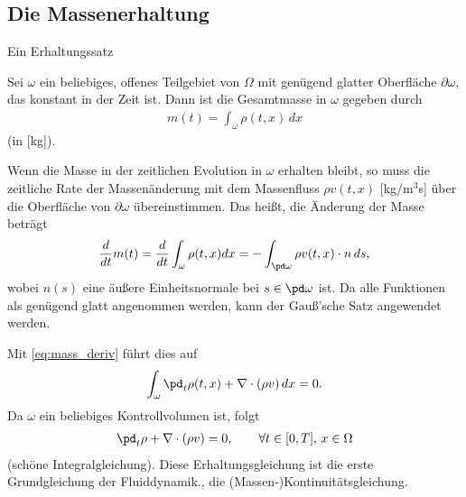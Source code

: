 \subsection{Die Massenerhaltung}
\begin{bemerkung} Ein Erhaltungssatz

Sei $\omega$ ein beliebiges, offenes Teilgebiet von $\Omega$ mit genügend glatter Oberfläche $\partial \omega$, das konstant in der Zeit ist. Dann ist die Gesamtmasse in $\omega$ gegeben durch
\begin{align*}
  m(t) = \int_{\omega}\rho(t, x) \,dx
\end{align*}
(in [kg]).

Wenn die Masse in der zeitlichen Evolution in $\omega$ erhalten bleibt, so muss die zeitliche Rate der Massenänderung mit dem Massenfluss $\rho v(t, x)$ [kg/m$^{3}$s] über die Oberfläche von $\partial \omega$ übereinstimmen. Das heißt, die Änderung der Masse beträgt
\begin{align}\label{eq:mass_deriv}
  \frac{d}{dt} m(t) = \frac d {dt} \int_{\omega} \rho(t, x) dx = - \int_{\pd \omega} \rho v(t, x) \cdot n \,ds,
\end{align}
wobei $n(s)$ eine äußere Einheitsnormale bei $s \in \pd \omega$ ist. Da alle Funktionen als genügend glatt angenommen werden, kann der Gauß'sche Satz angewendet werden. 

Mit \eqref{eq:mass_deriv} führt dies auf
\begin{align*}
  \int_{\omega} \pd_{t}\rho(t, x) + \nabla\cdot(\rho v)\,dx = 0. 
\end{align*}
Da $\omega$ ein beliebiges Kontrollvolumen ist, folgt
\begin{align*}
  \pd_{t} \rho + \nabla \cdot(\rho v) = 0, \qquad \forall t \in [0, T], \, x \in \Omega
\end{align*}
(schöne Integralgleichung).
Diese Erhaltungsgleichung ist die erste Grundgleichung der Fluiddynamik., die (Massen-)Kontinuitätsgleichung.  
\end{bemerkung}

